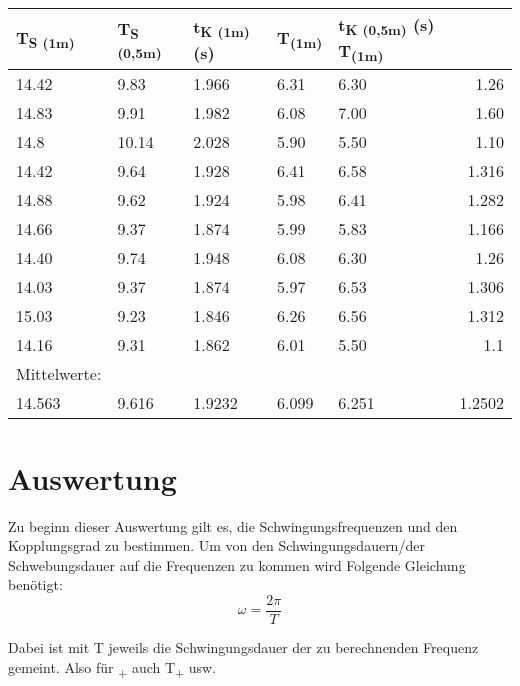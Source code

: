 \documentclass[titlepage=firstcover, captions=tableheading]{scrartcl}
\begin{document}
\begin{minipage}{\linewidth}
    \centering
    \begin{tabular}{lllllr}
        \toprule 
        T\textsubscript{S (1m)} & 
        T\textsubscript{S (0,5m)} &
        t\textsubscript{K (1m)} (s) &
        T\textsubscript{(1m)} & 
        t\textsubscript{K (0,5m)} (s)
        T\textsubscript{(1m)} & \\
        \midrule
        14.42 &  9.83 & 1.966 & 6.31 & 6.30 & 1.26 \\
        14.83 &  9.91 & 1.982 & 6.08 & 7.00 & 1.60 \\
        14.8  & 10.14 & 2.028 & 5.90 & 5.50 & 1.10 \\
        14.42 &  9.64 & 1.928 & 6.41 & 6.58 & 1.316\\
        14.88 &  9.62 & 1.924 & 5.98 & 6.41 & 1.282\\
        14.66 &  9.37 & 1.874 & 5.99 & 5.83 & 1.166\\
        14.40 &  9.74 & 1.948 & 6.08 & 6.30 & 1.26\\
        14.03 &  9.37 & 1.874 & 5.97 & 6.53 & 1.306\\
        15.03 &  9.23 & 1.846 & 6.26 & 6.56 & 1.312\\
        14.16 &  9.31 & 1.862 & 6.01 & 5.50 & 1.1\\
        \midrule
        Mittelwerte:\\
        14.563 & 9.616 & 1.9232 & 6.099 & 6.251 & 1.2502\\
        
        \bottomrule
        
    \end{tabular}
    \label{tab:4}
\end{minipage}

\pagebreak

\section{Auswertung}

Zu beginn dieser Auswertung gilt es, die Schwingungsfrequenzen und den Kopplungsgrad zu bestimmen.
Um von den Schwingungsdauern/der Schwebungsdauer auf die Frequenzen zu kommen wird Folgende Gleichung benötigt:
\begin{displaymath}
    \omega = \frac{2\pi}{T}
\end{displaymath}

Dabei ist mit T jeweils die Schwingungsdauer der zu berechnenden Frequenz gemeint.
Also für \omega\textsubscript{+} auch T\textsubscript{+} usw.
\end{document}
